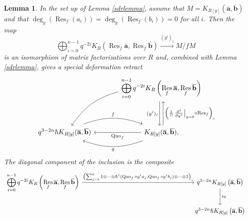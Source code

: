 \documentclass{article}
\DeclareMathOperator{\Res}{Res}
\DeclareMathOperator{\Quo}{Quo}
\theoremstyle{plain} %
\newtheorem{lemma}[theorem]{Lemma}
\theoremstyle{definition} %
\theoremstyle{remark} %
\begin{document}
\begin{lemma}\label{lemma:sdrkoszul}
    In the set up of Lemma \ref{sdrlemma}, assume that $M=K_{R[y]}(\mathbf{\overline a},\mathbf{\overline b})$ and that $\deg_y(\Res_f(a_i))=\deg_y(\Res_f(b_i))=0$ for all $i$. Then the map
    $$\bigoplus_{i=0}^{n -1} q^{-2i}K_{R}\left(\Res_f\mathbf{\overline a},\Res_f\mathbf{\overline b}\right)\xrightarrow{(y^i)_i}M/fM$$ is an isomorphism of matrix factorizations over $R$ and, combined with Lemma \ref{sdrlemma}, gives a special deformation retract
     $$\begin{tikzcd}[column sep=large, ]
    &\displaystyle\bigoplus_{i=0}^{n -1} q^{-2i}K_{R}\left(\Res_f\mathbf{\overline a},\Res_f\mathbf{\overline b}\right)\ar[dd, shift right=0.6ex, "(y^i)_i", swap]\ar[dd, leftarrow, shift left=0.6ex, "\left(\frac{1}{i!}\left.\frac{\partial^i}{\partial y^i}\right|_{y=0}\circ \Res_f\right)_i"]\arrow[ddl, "{}", bend right=20, swap]\\\\
    q^{3-2n}\hslash K_{R[y]}(\mathbf{\overline a},\mathbf{\overline b})\arrow[r, "f", shift left=0.5ex, bend left=20]& K_{R[y]}(\mathbf{\overline a},\mathbf{\overline b})\ar[l, "\Quo_f"]\arrow[l, "g", shift left=0.5ex, bend left=20], 
\end{tikzcd}$$
The diagonal component of the inclusion is the composite
$$
\begin{tikzcd}
    \displaystyle\bigoplus_{i=0}^{n-1}q^{-2i}K_{R}\left(\Res_f\mathbf{\overline a},\Res_f\mathbf{\overline b}\right) \arrow[r, "{\left(\sum_{j=1}^k1\otimes\cdots \otimes\hslash^1(\Quo_f\circ y^i a_j,\Quo_f\circ y^i b_j)\otimes\cdots\otimes 1\right)_i}"] &[5.5cm] q^{3-2n}K_{R[y]}\left(\mathbf{\overline a},\mathbf{\overline b}\right) \arrow[d,"s_\hslash"] \\& q^{3-2n}\hslash K_{R[y]}\left(\mathbf{\overline a},\mathbf{\overline b}\right)
\end{tikzcd}
$$
\end{lemma}


\end{document}
